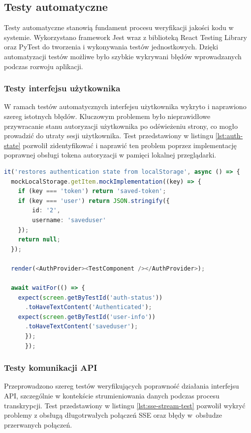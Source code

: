 \documentclass[a4paper,twoside,12pt]{book}
\begin{document}
\subsection{Testy automatyczne}
Testy automatyczne stanowią fundament procesu weryfikacji jakości kodu w systemie. Wykorzystano framework Jest \cite{bib:jest} wraz z biblioteką React Testing Library \cite{bib:react-testing-library} oraz PyTest \cite{bib:pytest} do tworzenia i wykonywania testów jednostkowych. Dzięki automatyzacji testów możliwe było szybkie wykrywani błędów wprowadzanych podczas rozwoju aplikacji.

\subsubsection{Testy interfejsu użytkownika}
W ramach testów automatycznych interfejsu użytkownika wykryto i naprawiono szereg istotnych błędów. Kluczowym problemem było nieprawidłowe przywracanie stanu autoryzacji użytkownika po odświeżeniu strony, co mogło prowadzić do utraty sesji użytkownika. Test przedstawiony w listingu \ref{lst:auth-state} pozwolił zidentyfikować i naprawić ten problem poprzez implementację poprawnej obsługi tokena autoryzacji w pamięci lokalnej przeglądarki.

\begin{lstlisting}[float=h, language=typescript, caption={Test przywracania stanu autoryzacji}, label={lst:auth-state}]
it('restores authentication state from localStorage', async () => {
  mockLocalStorage.getItem.mockImplementation((key) => {
    if (key === 'token') return 'saved-token';
    if (key === 'user') return JSON.stringify({ 
        id: '2', 
        username: 'saveduser' 
    });
    return null;
  });

  render(<AuthProvider><TestComponent /></AuthProvider>);
  
  await waitFor(() => {
    expect(screen.getByTestId('auth-status'))
      .toHaveTextContent('Authenticated');
    expect(screen.getByTestId('user-info'))
      .toHaveTextContent('saveduser');
      });
      });
    \end{lstlisting}

    
\subsubsection{Testy komunikacji API} 
  Przeprowadzono szereg testów weryfikujących poprawność działania interfejsu API, szczególnie w kontekście strumieniowania danych podczas procesu transkrypcji. Test przedstawiony w listingu \ref{lst:sse-stream-test} pozwolił wykryć problemy z obsługą długotrwałych połączeń SSE oraz błędy w~obsłudze przerwanych połączeń.
  
\end{document}
